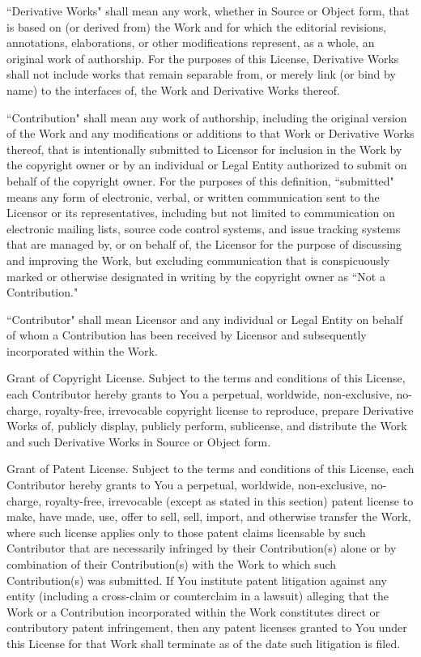 \begin{numul}
	``Derivative Works" shall mean any work, whether in Source or Object
	form, that is based on (or derived from) the Work and for which the
	editorial revisions, annotations, elaborations, or other modifications
	represent, as a whole, an original work of authorship. For the purposes
	of this License, Derivative Works shall not include works that remain
	separable from, or merely link (or bind by name) to the interfaces of,
	the Work and Derivative Works thereof.
	
	``Contribution" shall mean any work of authorship, including
	the original version of the Work and any modifications or additions
	to that Work or Derivative Works thereof, that is intentionally
	submitted to Licensor for inclusion in the Work by the copyright owner
	or by an individual or Legal Entity authorized to submit on behalf of
	the copyright owner. For the purposes of this definition, ``submitted"
	means any form of electronic, verbal, or written communication sent
	to the Licensor or its representatives, including but not limited to
	communication on electronic mailing lists, source code control systems,
	and issue tracking systems that are managed by, or on behalf of, the
	Licensor for the purpose of discussing and improving the Work, but
	excluding communication that is conspicuously marked or otherwise
	designated in writing by the copyright owner as ``Not a Contribution."
	
	``Contributor" shall mean Licensor and any individual or Legal Entity
	on behalf of whom a Contribution has been received by Licensor and
	subsequently incorporated within the Work.
	
	\item 
	Grant of Copyright License. Subject to the terms and conditions of
	this License, each Contributor hereby grants to You a perpetual,
	worldwide, non-exclusive, no-charge, royalty-free, irrevocable
	copyright license to reproduce, prepare Derivative Works of,
	publicly display, publicly perform, sublicense, and distribute the
	Work and such Derivative Works in Source or Object form.
	
	\item 
	Grant of Patent License. Subject to the terms and conditions of
	this License, each Contributor hereby grants to You a perpetual,
	worldwide, non-exclusive, no-charge, royalty-free, irrevocable
	(except as stated in this section) patent license to make, have made,
	use, offer to sell, sell, import, and otherwise transfer the Work,
	where such license applies only to those patent claims licensable
	by such Contributor that are necessarily infringed by their
	Contribution(s) alone or by combination of their Contribution(s)
	with the Work to which such Contribution(s) was submitted. If You
	institute patent litigation against any entity (including a
	cross-claim or counterclaim in a lawsuit) alleging that the Work
	or a Contribution incorporated within the Work constitutes direct
	or contributory patent infringement, then any patent licenses
	granted to You under this License for that Work shall terminate
	as of the date such litigation is filed.
	

\end{numul}
